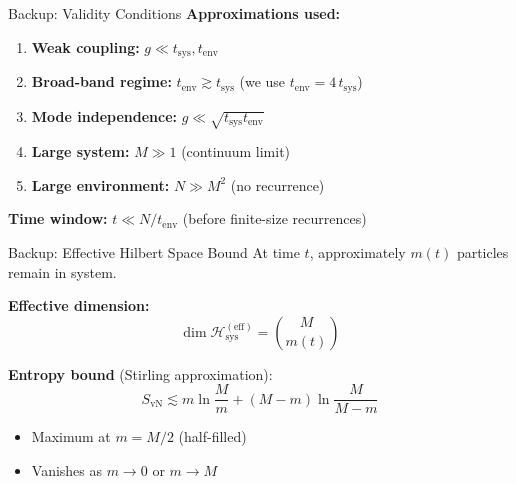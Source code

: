 \documentclass[aspectratio=169,11pt]{beamer}
\newcommand{\Hsys}{\mathcal{H}_{\mathrm{sys}}}
\begin{document}
\begin{frame}{Backup: Validity Conditions}
    \textbf{Approximations used:}
    \begin{enumerate}
        \item \textbf{Weak coupling:} $g \ll t_{\mathrm{sys}}, t_{\mathrm{env}}$
        \item \textbf{Broad-band regime:} $t_{\mathrm{env}} \gtrsim t_{\mathrm{sys}}$ (we use $t_{\mathrm{env}}=4\,t_{\mathrm{sys}}$)
        \item \textbf{Mode independence:} $g \ll \sqrt{t_{\mathrm{sys}} t_{\mathrm{env}}}$
        \item \textbf{Large system:} $M \gg 1$ (continuum limit)
        \item \textbf{Large environment:} $N \gg M^2$ (no recurrence)
    \end{enumerate}
    
    \vspace{0.3cm}
    
    \textbf{Time window:} $t \ll N/t_{\mathrm{env}}$ \quad (before finite-size recurrences)
\end{frame}

\begin{frame}{Backup: Effective Hilbert Space Bound}
    At time $t$, approximately $m(t)$ particles remain in system.
    
    \vspace{0.3cm}
    
    \textbf{Effective dimension:}
    \begin{equation*}
        \dim \Hsys^{\mathrm{(eff)}} = \binom{M}{m(t)}
    \end{equation*}
    
    \textbf{Entropy bound} (Stirling approximation):
    \begin{equation*}
        S_{\mathrm{vN}} \lesssim m \ln\frac{M}{m} + (M-m)\ln\frac{M}{M-m}
    \end{equation*}
    
    \begin{itemize}
        \item Maximum at $m = M/2$ (half-filled)
        \item Vanishes as $m \to 0$ or $m \to M$
    \end{itemize}
\end{frame}
\end{document}
